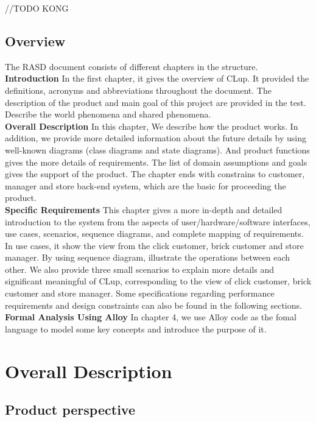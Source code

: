 \documentclass[a4paper,12pt]{report}
\begin{document}
//TODO KONG
\section{Overview}
The RASD document consists of different chapters in the structure.\\

\textbf{Introduction}  In the first chapter, it gives the overview of CLup. It provided the definitions, acronyms and abbreviations throughout the document. The description of the product and main goal of this project are provided in the test. Describe the world phenomena and shared phenomena.
\\


\textbf{Overall Description} In this chapter, We describe how the product works. In addition, we provide more detailed information about the future details by using well-known diagrams (class diagrams and state diagrams). And product functions gives the more details of requirements. The list of domain assumptions and goals gives the support of the product.  The chapter ends with constrains to customer, manager and store back-end system, which are the basic for proceeding the product.
\\

\textbf{Specific Requirements} This chapter gives a more in-depth and detailed introduction to the system from the aspects of user/hardware/software interfaces, use cases, scenarios, sequence diagrams, and complete mapping of requirements. In use cases, it show the view from the click customer, brick customer and store manager. By using sequence diagram, illustrate the operations between each other. We also provide three small scenarios to explain more details and significant meaningful of CLup, corresponding to the view of click customer, brick customer and store manager. Some specifications regarding performance requirements and design constraints can also be found in the following sections.\\

\textbf{Formal Analysis Using Alloy} In chapter 4, we use Alloy code as the fomal language to model some key concepts and introduce the purpose of it.\\


\chapter{Overall Description} \label{C2:OverallDescription}
\section{Product perspective}
\end{document}
